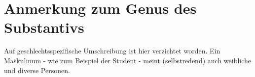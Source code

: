 
\chapter*{Anmerkung zum Genus des Substantivs}

Auf geschlechtsspezifische Umschreibung ist hier verzichtet worden. Ein Maskulinum - wie zum Beispiel der Student - meint (selbstredend) auch weibliche und diverse Personen.
